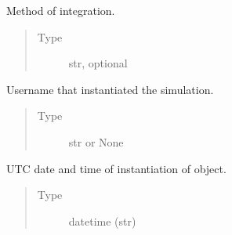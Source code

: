 \documentclass[a4paper,landscape,10pt,english]{sphinxmanual}
\begin{document}
\begin{fulllineitems}
\begin{fulllineitems}
\begin{quote}
\begin{description}
\end{description}\end{quote}

\end{fulllineitems}


\begin{fulllineitems}
\label{\detokenize{code_docs/simulation_API.simulation:simulation_API.simulation.simulations.Simulation.method}}
Method of integration.
\begin{quote}\begin{description}
\item[{Type}] \leavevmode
str, optional

\end{description}\end{quote}

\end{fulllineitems}


\begin{fulllineitems}
\label{\detokenize{code_docs/simulation_API.simulation:simulation_API.simulation.simulations.Simulation.user_name}}
Username that instantiated the simulation.
\begin{quote}\begin{description}
\item[{Type}] \leavevmode
str or None

\end{description}\end{quote}

\end{fulllineitems}


\begin{fulllineitems}
\label{\detokenize{code_docs/simulation_API.simulation:simulation_API.simulation.simulations.Simulation.date}}
UTC date and time of instantiation of object.
\begin{quote}\begin{description}
\item[{Type}] \leavevmode
datetime (str)


\end{description}
\end{quote}
\end{fulllineitems}
\end{fulllineitems}
\end{document}
